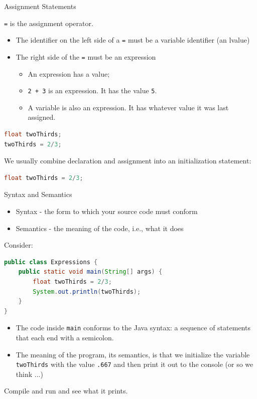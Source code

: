 \documentclass{beamer}
\begin{document}
\begin{frame}[fragile]{Assignment Statements}


{\tt =} is the assignment operator.
\begin{itemize}
\item The identifier on the left side of a {\tt =} must be a variable identifier (an lvalue)
\item The right side of the {\tt =} must be an expression
\begin{itemize}
\item An expression has a value;
\item {\tt 2 + 3} is an expression.  It has the value {\tt 5}.
\item A variable is also an expression.  It has whatever value it was last assigned.
\end{itemize}

\end{itemize}

\begin{lstlisting}[language=Java]
float twoThirds;
twoThirds = 2/3;
\end{lstlisting}
We usually combine declaration and assignment into an initialization statement:
\begin{lstlisting}[language=Java]
float twoThirds = 2/3;
\end{lstlisting}


\end{frame}

\begin{frame}[fragile]{Syntax and Semantics}


\begin{itemize}
\item Syntax - the form to which your source code must conform
\item Semantics - the meaning of the code, i.e., what it does
\end{itemize}
Consider:
\begin{lstlisting}[language=Java]
public class Expressions {
    public static void main(String[] args) {
        float twoThirds = 2/3;
        System.out.println(twoThirds);
    }
}
\end{lstlisting}

\begin{itemize}
\item The code inside {\tt main} conforms to the Java syntax: a sequence of statements that each end with a semicolon.
\item The meaning of the program, its semantics, is that we initialize the variable {\tt twoThirds} with the value {\tt .667} and then print it out to the console (or so we think ...)
\end{itemize}

Compile and run  and see what it prints.

\end{frame}
\end{document}
